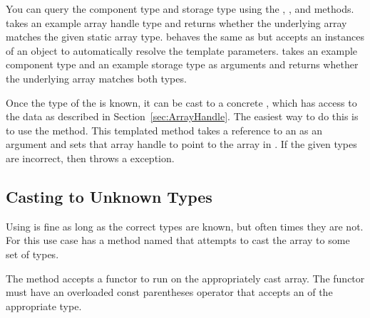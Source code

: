 You can query the component type and storage type using the
, , and
 methods.  takes an
example array handle type and returns whether the underlying array matches
the given static array type.  behaves the same as
 but accepts an instances of an
 object to automatically resolve the template
parameters.  takes an example
component type and an example storage type as arguments and returns whether
the underlying array matches both types.


Once the type of the  is known, it can
be cast to a concrete , which has access to the
data as described in Section~\ref{sec:ArrayHandle}. The easiest way to do
this is to use the  method. This templated method takes a
reference to an  as an argument and sets that
array handle to point to the array in .
If the given types are incorrect, then  throws
a  exception.


\subsection{Casting to Unknown Types}


Using  is fine as long as the correct types are
known, but often times they are not. For this use case
 has a method named
 that attempts to cast the array to some set of
types.

The  method accepts a functor to run on the
appropriately cast array. The functor must have an overloaded const
parentheses operator that accepts an  of the
appropriate type.


